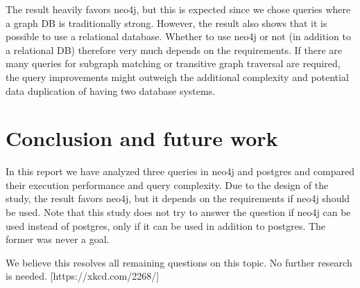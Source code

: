 \documentclass[11pt, a4paper,oneside,chapterprefix=false]{scrbook}
\begin{document}
The result heavily favors neo4j, but this is expected since we chose queries where a graph DB is traditionally strong.
However, the result also shows that it is possible to use a relational database.
Whether to use neo4j or not (in addition to a relational DB) therefore very much depends on the requirements.
If there are many queries for subgraph matching or transitive graph traversal are required, the query improvements might outweigh the additional complexity and potential data duplication of having two database systems.

\chapter{Conclusion and future work} \label{chp:conclusion}

In this report we have analyzed three queries in neo4j and postgres and compared their execution performance and query complexity. 
Due to the design of the study, the result favors neo4j, but it depends on the requirements if neo4j should be used.
Note that this study does not try to answer the question if neo4j can be used instead of postgres, only if it can be used in addition to postgres. The former was never a goal.

We believe this resolves all remaining questions on this topic. No further research is needed. [https://xkcd.com/2268/]




\end{document}

